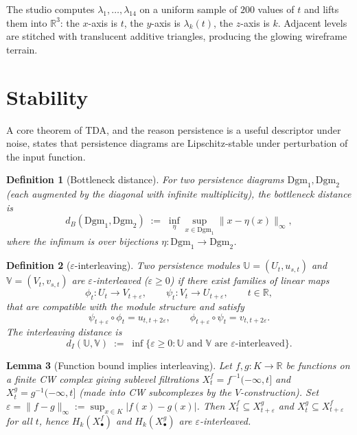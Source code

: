 \documentclass[11pt]{article}
\theoremstyle{persdef}
\newtheorem{definition}{Definition}[section]
\newtheorem{lemma}[definition]{Lemma}
\newcommand{\R}{\mathbb{R}}
\newcommand{\X}{X}
\newcommand{\PD}{\mathrm{Dgm}}
\newcommand{\Land}{\lambda}
\newcommand{\Hk}[1]{H_{#1}}
\begin{document}
The studio computes $\Land_1,\dots,\Land_{14}$ on a uniform sample of $200$ values of $t$ and lifts them into $\R^3$: the $x$-axis is $t$, the $y$-axis is $\Land_k(t)$, the $z$-axis is $k$. Adjacent levels are stitched with translucent additive triangles, producing the glowing wireframe terrain.

\section{Stability}

A core theorem of TDA, and the reason persistence is a useful descriptor under noise, states that persistence diagrams are Lipschitz-stable under perturbation of the input function.

\begin{definition}[Bottleneck distance]\label{def:bottle}
For two persistence diagrams $\PD_1,\PD_2$ (each augmented by the diagonal with infinite multiplicity), the \emph{bottleneck distance} is
\[
d_B(\PD_1,\PD_2) \;:=\; \inf_{\eta} \sup_{x\in\PD_1} \|x - \eta(x)\|_\infty,
\]
where the infimum is over bijections $\eta : \PD_1 \to \PD_2$.
\end{definition}

\begin{definition}[$\varepsilon$-interleaving]\label{def:interleave}
Two persistence modules $\mathbb{U}=(U_t,u_{s,t})$ and $\mathbb{V}=(V_t,v_{s,t})$ are \emph{$\varepsilon$-interleaved} ($\varepsilon\geq 0$) if there exist families of linear maps
\[
\phi_t : U_t \to V_{t+\varepsilon}, \qquad \psi_t : V_t \to U_{t+\varepsilon}, \qquad t\in\R,
\]
that are compatible with the module structure and satisfy
\[
\psi_{t+\varepsilon}\circ\phi_t = u_{t,t+2\varepsilon},\qquad \phi_{t+\varepsilon}\circ\psi_t = v_{t,t+2\varepsilon}.
\]
The \emph{interleaving distance} is
\[
d_I(\mathbb{U},\mathbb{V}) \;:=\; \inf\{\varepsilon\geq 0 : \mathbb{U}\text{ and }\mathbb{V}\text{ are }\varepsilon\text{-interleaved}\}.
\]
\end{definition}

\begin{lemma}[Function bound implies interleaving]\label{lem:funcinterleave}
Let $f,g:K\to\R$ be functions on a finite CW complex giving sublevel filtrations $\X^f_t=f^{-1}(-\infty,t]$ and $\X^g_t=g^{-1}(-\infty,t]$ (made into CW subcomplexes by the $V$-construction). Set $\varepsilon = \|f-g\|_\infty := \sup_{x\in K}|f(x)-g(x)|$. Then $\X^f_t\subseteq\X^g_{t+\varepsilon}$ and $\X^g_t\subseteq\X^f_{t+\varepsilon}$ for all $t$, hence $\Hk{k}(\X^f_\bullet)$ and $\Hk{k}(\X^g_\bullet)$ are $\varepsilon$-interleaved.
\end{lemma}
\end{document}
